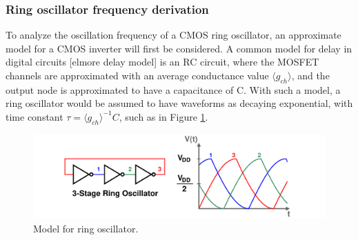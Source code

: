 	\subsubsection{Ring oscillator frequency derivation}
		To analyze the oscillation frequency of a CMOS ring oscillator, an approximate model for a CMOS inverter will first be considered. A common model for delay in digital circuits [elmore delay model] is an RC circuit, where the MOSFET channels are approximated with an average conductance value $\langle g_{ch} \rangle$, and the output node is approximated to have a capacitance of C. With such a model, a ring oscillator would be assumed to have waveforms as decaying exponential, with time constant $\tau = \langle g_{ch} \rangle^{-1}C$, such as in Figure \ref{fig:rosc_rc}.
		\begin{figure}[htb!]
			\center\includegraphics[width=0.8\linewidth, angle=0]{figs/theory/osc_waves}
			\caption{Model for ring oscillator.}
			\label{fig:rosc_rc}
		\end{figure}

